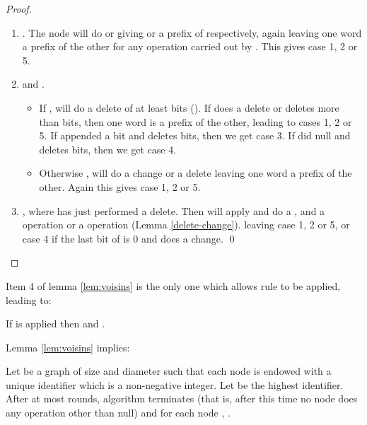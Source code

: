 \documentclass[11pt,envcountsame,letterpaper]{llncs}
\begin{document}
\begin{proof}
\begin{enumerate}
\item . The node  will do  or  giving
  or a prefix of  respectively, again leaving one word a prefix 
of the other for any operation carried out by .
This gives case 1, 2 or 5.

\item  and  . 
\begin{itemize}
\item If ,  will do a delete of at least  bits (). If  does a delete or  deletes more than  bits, then one word is a prefix
of the other, leading to cases 1, 2 or 5.
If  appended a bit and  deletes  bits, then we get case 3.
If  did null and  deletes  bits, then we get case 4.
\item Otherwise ,  will do a change 
or a delete leaving one word a prefix of the other. Again
this gives case 1, 2 or 5.


\end{itemize}
\item ,  
where  has just performed a delete.
Then  will apply  and do a , and  a  operation or
a  operation (Lemma \ref{delete-change}).
leaving case 1, 2 or 5, or case 4 if the last bit
of  is 0 and  does a change.
\qed
\end{enumerate}
\end{proof}

Item 4 of lemma \ref{lem:voisins} is the only one which allows rule  to be applied, leading to:
\begin{corollary}
\label{cor:bound3}
If  is applied then
 and .
\end{corollary}

Lemma \ref{lem:voisins} implies:
\begin{theorem}\label{th:complexity}
Let  be a graph of size  and diameter  such that each node 
is endowed with a unique identifier  which is a
non-negative
integer.
Let  be the highest identifier.
After at most  rounds,  algorithm  terminates
(that is, after this time no node does any operation other than null)
and for each node , .
\end{theorem}
\end{document}
